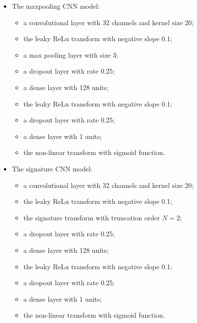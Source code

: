 \documentclass[]{article}
\renewcommand{\(}{\left(}
\renewcommand{\)}{\right)}
\begin{document}
\begin{itemize}
\begin{itemize}
			\item[-]a dropout layer with rate 0.3;
			\item[-]a dense layer with 1 units;
			\item[-]the non-linear transform with sigmoid function.			
		\end{itemize}
		\item The maxpooling CNN model:
		\begin{itemize}
			\item[-]a convolutional layer with 32 channels and kernel size 20;
			\item[-]the leaky ReLu transform with negative slope 0.1;
			\item[-]a max pooling layer with size 3;
			\item[-]a dropout layer with rate 0.25;
			\item[-]a dense layer with 128 units;
			\item[-]the leaky ReLu transform with negative slope 0.1;
			\item[-]a dropout layer with rate 0.25;
			\item[-]a dense layer with 1 units;	
			\item[-]the non-linear transform with sigmoid function.
		\end{itemize}
		\item The signature CNN model:
		\begin{itemize}
			\item[-]a convolutional layer with 32 channels and kernel size 20;
			\item[-]the leaky ReLu transform with negative slope 0.1;
			\item[-]the signature transform with truncation order $N=2$;
			\item[-]a dropout layer with rate 0.25;
			\item[-]a dense layer with 128 units;
			\item[-]the leaky ReLu transform with negative slope 0.1;
			\item[-]a dropout layer with rate 0.25;
			\item[-]a dense layer with 1 units;
			\item[-]the non-linear transform with sigmoid function.	
		\end{itemize}
	\end{itemize}
\end{document}
